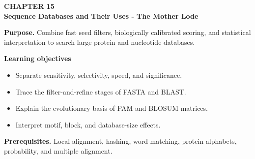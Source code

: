 \documentclass[11pt]{article}
\begin{document}
\begin{tcolorbox}[
  enhanced,breakable,colback=Primary!4,colframe=Primary,boxrule=0.9pt,
  arc=2mm,left=3mm,right=3mm,top=2.5mm,bottom=2.5mm]
{\sffamily\color{Accent}\bfseries CHAPTER 15}\\[-1pt]
{\sffamily\LARGE\bfseries\color{Primary} Sequence Databases and Their Uses - The Mother Lode}

\vspace{2pt}
\textbf{Purpose.} Combine fast seed filters, biologically calibrated scoring, and statistical interpretation to search large protein and nucleotide databases.

\textbf{Learning objectives}
\begin{itemize}
  \item Separate sensitivity, selectivity, speed, and significance.
  \item Trace the filter-and-refine stages of FASTA and BLAST.
  \item Explain the evolutionary basis of PAM and BLOSUM matrices.
  \item Interpret motif, block, and database-size effects.
\end{itemize}

\textbf{Prerequisites.} Local alignment, hashing, word matching, protein alphabets, probability, and multiple alignment.
\end{tcolorbox}
\end{document}

